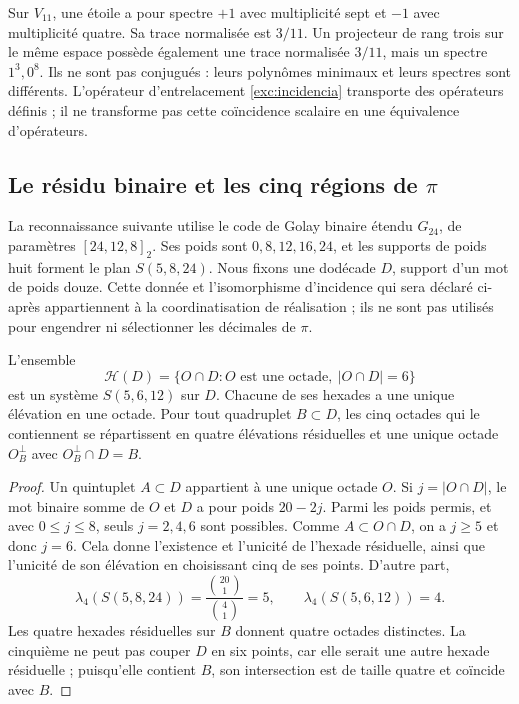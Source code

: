 \begin{remark}
Sur $V_{11}$, une étoile a pour spectre $+1$ avec multiplicité sept
et $-1$ avec multiplicité quatre. Sa trace normalisée est $3/11$.
Un projecteur de rang trois sur le même espace possède également une trace
normalisée $3/11$, mais un spectre $1^3,0^8$. Ils ne sont pas conjugués : leurs
polynômes minimaux et leurs spectres sont différents. L'opérateur d'entrelacement
\eqref{exc:incidencia} transporte des opérateurs définis ; il ne transforme pas
cette coïncidence scalaire en une équivalence d'opérateurs.
\end{remark}



\subsection{Le résidu binaire et les cinq régions de \texorpdfstring{$\pi$}{pi}}
\label{exc:cinco-regiones}

La reconnaissance suivante utilise le code de Golay binaire
étendu $G_{24}$, de paramètres $[24,12,8]_2$. Ses poids sont
$0,8,12,16,24$, et les supports de poids huit forment le plan
$S(5,8,24)$. Nous fixons une dodécade $D$, support d'un mot de poids
douze. Cette donnée et l'isomorphisme d'incidence qui sera déclaré
ci-après appartiennent à la coordinatisation de réalisation ; ils ne sont pas utilisés pour
engendrer ni sélectionner les décimales de $\pi$.

\begin{proposition}
\label{exc:residuo-binario}
L'ensemble
\[
 \mathcal H(D)=
 \{O\cap D: O\text{ est une octade},\ |O\cap D|=6\}
\]
est un système $S(5,6,12)$ sur $D$. Chacune de ses hexades a une unique élévation en une octade. Pour tout quadruplet $B\subset D$, les cinq octades qui le contiennent se répartissent en quatre élévations résiduelles et une unique octade $O_B^\perp$ avec $O_B^\perp\cap D=B$.
\end{proposition}

\begin{proof}
Un quintuplet $A\subset D$ appartient à une unique octade $O$. Si
$j=|O\cap D|$, le mot binaire somme de $O$ et $D$ a pour poids
$20-2j$. Parmi les poids permis, et avec $0\leq j\leq8$, seuls
$j=2,4,6$ sont possibles. Comme $A\subset O\cap D$, on a $j\geq5$
et donc $j=6$. Cela donne l'existence et l'unicité de l'hexade
résiduelle, ainsi que l'unicité de son élévation en choisissant cinq de ses
points. D'autre part,
\[
 \lambda_4(S(5,8,24))=\frac{\binom{20}1}{\binom41}=5,
 \qquad
 \lambda_4(S(5,6,12))=4.
\]
Les quatre hexades résiduelles sur $B$ donnent quatre octades distinctes. La cinquième ne peut pas couper $D$ en six points, car elle serait une autre hexade résiduelle ; puisqu'elle contient $B$, son intersection est de taille quatre et coïncide avec $B$.
\end{proof}

